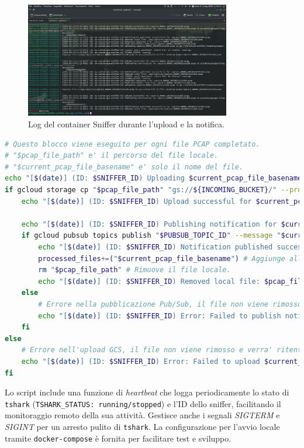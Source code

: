 \documentclass[11pt, a4paper]{article}
\begin{document}
\begin{figure}[!htbp]
    \centering
    \includegraphics[width=0.8\textwidth]{pics/LOG_SNIFFER_131433.png}
    \caption{Log del container Sniffer durante l'upload e la notifica.}
    \label{fig:sniffer_logs}
\end{figure}

\begin{lstlisting}[language=bash, style=bashstyle, caption={Estratto da \texttt{sniffer\_entrypoint.sh}: Upload a GCS e notifica a Pub/Sub.}, label=lst:sniffer_upload_notify, basicstyle=\ttfamily\scriptsize]
# Questo blocco viene eseguito per ogni file PCAP completato.
# "$pcap_file_path" e' il percorso del file locale.
# "$current_pcap_file_basename" e' solo il nome del file.
echo "[$(date)] (ID: $SNIFFER_ID) Uploading $current_pcap_file_basename to gs://${INCOMING_BUCKET}/..."
if gcloud storage cp "$pcap_file_path" "gs://${INCOMING_BUCKET}/" --project "$GCP_PROJECT_ID"; then
    echo "[$(date)] (ID: $SNIFFER_ID) Upload successful for $current_pcap_file_basename."

    echo "[$(date)] (ID: $SNIFFER_ID) Publishing notification for $current_pcap_file_basename to ${PUBSUB_TOPIC_ID}..."
    if gcloud pubsub topics publish "$PUBSUB_TOPIC_ID" --message "$current_pcap_file_basename" --project "$GCP_PROJECT_ID"; then
        echo "[$(date)] (ID: $SNIFFER_ID) Notification published successfully for $current_pcap_file_basename."
        processed_files+=("$current_pcap_file_basename") # Aggiunge alla lista dei file processati.
        rm "$pcap_file_path" # Rimuove il file locale.
        echo "[$(date)] (ID: $SNIFFER_ID) Removed local file: $pcap_file_path"
    else
        # Errore nella pubblicazione Pub/Sub, il file non viene rimosso e verra' ritentato.
        echo "[$(date)] (ID: $SNIFFER_ID) Error: Failed to publish notification for $current_pcap_file_basename. Will retry."
    fi
else
    # Errore nell'upload GCS, il file non viene rimosso e verra' ritentato.
    echo "[$(date)] (ID: $SNIFFER_ID) Error: Failed to upload $current_pcap_file_basename to GCS. Will retry."
fi
\end{lstlisting} 
Lo script include una funzione di \textit{heartbeat} che logga periodicamente lo stato di \texttt{tshark} (\texttt{TSHARK\_STATUS: running/stopped}) e l'ID dello sniffer, facilitando il monitoraggio remoto della sua attività. Gestisce anche i segnali \textit{SIGTERM} e \textit{SIGINT} per un arresto pulito di \texttt{tshark}. La configurazione per l'avvio locale tramite \texttt{docker-compose} è fornita per facilitare test e sviluppo.
\end{document}

